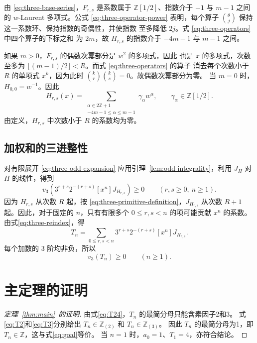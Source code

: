 \documentclass[a4paper,11pt]{article}
\numberwithin{equation}{section}
\theoremstyle{chinese}
\newcommand{\Z}{\mathbb Z}
\begin{document}
由 \eqref{eq:three-base-series}，\(F_{r,s}\) 是系数属于
\(\mathbb Z[1/2]\)、指数介于 \(-1\) 与 \(m-1\) 之间的 \(w\)-Laurent
多项式。公式 \eqref{eq:three-operator-power} 表明，每个算子
\(\binom{\theta}{j}\) 保持这一系数环、保持指数的奇偶性，并使指数
至多降低 \(2j\)。式 \eqref{eq:three-operators} 中四个算子的下标之和
为 \(2m\)，故 \(H_{r,s}\) 的指数介于 \(-4m-1\) 与 \(m-1\) 之间。

如果 \(m>0\)，\(F_{r,s}\) 的偶数次幂部分是 \(w^2\) 的多项式，因此
也是 \(x\) 的多项式，次数至多为
\(\lfloor(m-1)/2\rfloor<R\)。而式 \eqref{eq:three-operators} 的算子
消去每个次数小于 \(R\) 的单项式 \(x^k\)，因为此时
\(\binom{k}{r}\binom{k}{s}=0\)。故偶数次幂部分为零。
当 \(m=0\) 时，\(H_{0,0}=w^{-1}\)。因此
\begin{equation}
H_{r,s}(x)=
\sum_{\substack{\alpha\in2\Z+1\\-4m-1\le\alpha\le m-1}}
\gamma_\alpha w^\alpha,
\qquad \gamma_\alpha\in\mathbb Z[1/2].
\label{eq:three-odd-expansion}
\end{equation}
由定义，\(H_{r,s}\) 中次数小于 \(R\) 的系数均为零。

\subsection{加权和的三进整性}

对有限展开 \eqref{eq:three-odd-expansion} 应用引理~\ref{lem:odd-integrality}，利用 \(J_H\) 对 \(H\) 的线性，得到
\[
v_3\left(3^{r+s}2^{-(r+s)}[x^n]J_{H_{r,s}}\right)\ge0
\qquad(r,s\ge0,\ n\ge1).
\]
因为 \(H_{r,s}\) 从次数 \(R\) 起，按
\eqref{eq:three-primitive-definition}，\(J_{H_{r,s}}\) 从次数
\(R+1\) 起。因此，对于固定的 \(n\)，只有有限多个
\(0\le r,s<n\) 的项可能贡献 \(x^n\) 的系数。
由式\eqref{eq:three-reindex}，得
\[
T_n=
\sum_{0\le r,s<n}3^{r+s}2^{-(r+s)}[x^n]J_{H_{r,s}}.
\]
每个加数的 \(3\) 阶均非负，所以
\begin{equation}\label{eq:T3}
v_3(T_n)\ge0\qquad(n\ge1).
\end{equation}

\section{主定理的证明}
\begin{proof}[定理~\ref{thm:main}~的证明]
由式\eqref{eq:T24}，$T_n$ 的最简分母只能含素因子2和3。
式\eqref{eq:T2}和\eqref{eq:T3}分别给出 $T_n\in\Z_{(2)}$ 和 $T_n\in\Z_{(3)}$。
因此 $T_n$ 的最简分母为1，即 $T_n\in\Z$，这与式\eqref{eq:goal}等价。
当 $n=1$ 时，$a_0=1$、$T_1=4$，亦符合结论。
\end{proof}
\end{document}
